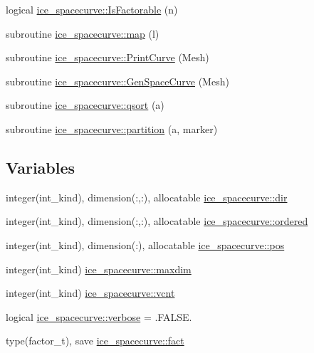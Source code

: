 \begin{DoxyCompactItemize}
logical \hyperlink{namespaceice__spacecurve_a918d591b92dcee27d6d7f50c92022d69}{ice\_\-spacecurve::IsFactorable} (n)
\item 
subroutine \hyperlink{namespaceice__spacecurve_a841d5cc5194de1c7aef94576c0eb5405}{ice\_\-spacecurve::map} (l)
\item 
subroutine \hyperlink{namespaceice__spacecurve_ab6b0639f3e032362a2ad97a2e4e160e5}{ice\_\-spacecurve::PrintCurve} (Mesh)
\item 
subroutine \hyperlink{namespaceice__spacecurve_a317f0810215a0c684a8073ff21eb71b1}{ice\_\-spacecurve::GenSpaceCurve} (Mesh)
\item 
subroutine \hyperlink{namespaceice__spacecurve_aa67766fe40142781287d478cff83322e}{ice\_\-spacecurve::qsort} (a)
\item 
subroutine \hyperlink{namespaceice__spacecurve_a99e4bd1c6625a5a14e10c5fa91f0df33}{ice\_\-spacecurve::partition} (a, marker)
\end{DoxyCompactItemize}
\subsection*{Variables}
\begin{DoxyCompactItemize}
\item 
integer(int\_\-kind), dimension(:,:), allocatable \hyperlink{namespaceice__spacecurve_a39f2092f453a0a651c4efda8291bc0cf}{ice\_\-spacecurve::dir}
\item 
integer(int\_\-kind), dimension(:,:), allocatable \hyperlink{namespaceice__spacecurve_a1338f6fba84ddb72ad229795cc040231}{ice\_\-spacecurve::ordered}
\item 
integer(int\_\-kind), dimension(:), allocatable \hyperlink{namespaceice__spacecurve_a440379dc8df1be7a6903b0df94d181b1}{ice\_\-spacecurve::pos}
\item 
integer(int\_\-kind) \hyperlink{namespaceice__spacecurve_aee0a00b4e25e4f5c770a300d2093feb7}{ice\_\-spacecurve::maxdim}
\item 
integer(int\_\-kind) \hyperlink{namespaceice__spacecurve_ad07b7ca9c91db52f0cee81fac7c71c5a}{ice\_\-spacecurve::vcnt}
\item 
logical \hyperlink{namespaceice__spacecurve_a486a46d8f8d78fea131f7fe3d429b0dc}{ice\_\-spacecurve::verbose} = .FALSE.
\item 
type(factor\_\-t), save \hyperlink{namespaceice__spacecurve_aa520de333aa94f300555f836420d5b30}{ice\_\-spacecurve::fact}
\end{DoxyCompactItemize}
